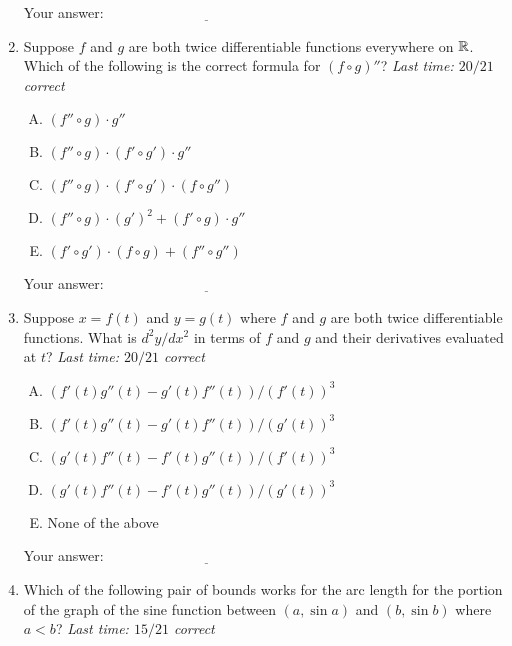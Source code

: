 \documentclass[10pt]{amsart}
\begin{document}
\begin{enumerate}
  \vspace{0.1in}
  Your answer: $\underline{\qquad\qquad\qquad\qquad\qquad\qquad\qquad}$
  \vspace{0.6in}

\item Suppose $f$ and $g$ are both twice differentiable functions
  everywhere on $\mathbb{R}$. Which of the following is the correct formula
  for $(f \circ g)''$? {\em Last time: $20/21$ correct}

  \begin{enumerate}[(A)]

  \item $(f'' \circ g) \cdot g''$
  \item $(f'' \circ g) \cdot (f' \circ g') \cdot g''$
  \item $(f'' \circ g) \cdot (f' \circ g') \cdot (f \circ g'')$
  \item $(f'' \circ g) \cdot (g')^2 + (f' \circ g) \cdot g''$
  \item $(f' \circ g') \cdot (f \circ g) + (f'' \circ g'')$
  \end{enumerate}

  \vspace{0.1in}
  Your answer: $\underline{\qquad\qquad\qquad\qquad\qquad\qquad\qquad}$
  \vspace{0.6in}

\item Suppose $x = f(t)$ and $y = g(t)$ where $f$ and $g$ are both
  twice differentiable functions. What is $d^2y/dx^2$ in terms of $f$
  and $g$ and their derivatives evaluated at $t$? {\em Last time:
    $20/21$ correct}

  \begin{enumerate}[(A)]
  \item $(f'(t)g''(t) - g'(t)f''(t))/(f'(t))^3$
  \item $(f'(t)g''(t) - g'(t)f''(t))/(g'(t))^3$
  \item $(g'(t)f''(t) - f'(t)g''(t))/(f'(t))^3$
  \item $(g'(t)f''(t) - f'(t)g''(t))/(g'(t))^3$
  \item None of the above
  \end{enumerate}

  \vspace{0.1in}
  Your answer: $\underline{\qquad\qquad\qquad\qquad\qquad\qquad\qquad}$
  \vspace{0.6in}

\item Which of the following pair of bounds works for the arc length
  for the portion of the graph of the sine function between $(a,\sin
  a)$ and $(b, \sin b)$ where $a < b$? {\em Last time: $15/21$
    correct}


\end{enumerate}
\end{document}

